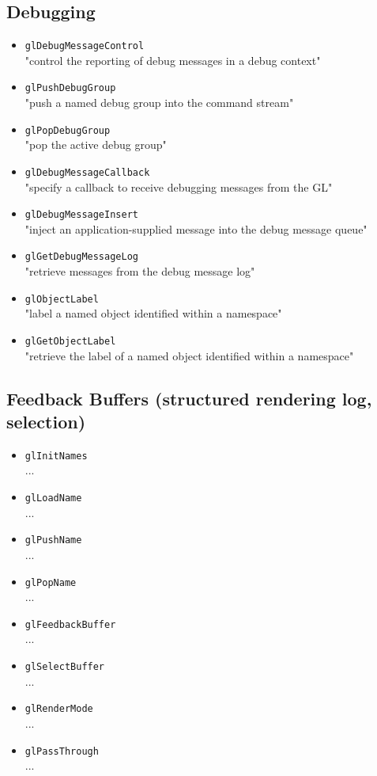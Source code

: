 \documentclass[12pt]{article}
\begin{document}
\subsection{Debugging}
\begin{itemize}
\item \texttt{glDebugMessageControl} \\
	"control the reporting of debug messages in a debug context"
\item \texttt{glPushDebugGroup} \\
	"push a named debug group into the command stream"
\item \texttt{glPopDebugGroup} \\
	"pop the active debug group"
\item \texttt{glDebugMessageCallback} \\
	"specify a callback to receive debugging messages from the GL"
\item \texttt{glDebugMessageInsert} \\
	"inject an application-supplied message into the debug message queue"
\item \texttt{glGetDebugMessageLog} \\
	"retrieve messages from the debug message log"
\item \texttt{glObjectLabel} \\
	"label a named object identified within a namespace"
\item \texttt{glGetObjectLabel} \\
	"retrieve the label of a named object identified within a namespace"
\end{itemize}

\subsection{Feedback Buffers (structured rendering log, selection)}
\begin{itemize}
\item \texttt{glInitNames} \\
	...
\item \texttt{glLoadName} \\
	...
\item \texttt{glPushName} \\
	...
\item \texttt{glPopName} \\
	...
\item \texttt{glFeedbackBuffer} \\
	...
\item \texttt{glSelectBuffer} \\
	...
\item \texttt{glRenderMode} \\
	...
\item \texttt{glPassThrough} \\
	...
\end{itemize}
\end{document}
